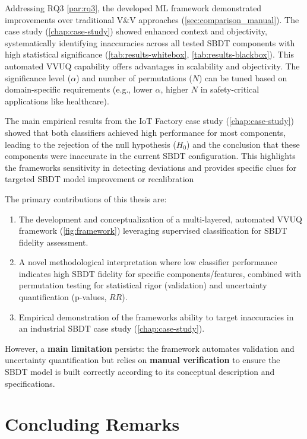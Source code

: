 Addressing RQ3 \autoref{par:rq3}, the developed ML framework demonstrated improvements over traditional V&V approaches (\autoref{sec:comparison_manual}). The case study (\autoref{chap:case-study}) showed enhanced context and objectivity, systematically identifying inaccuracies across all tested SBDT components with high statistical significance (\autoref{tab:results-whitebox}, \autoref{tab:results-blackbox}). This automated VVUQ capability offers advantages in scalability and objectivity. The significance level ($\alpha$) and number of permutations ($N$) can be tuned based on domain-specific requirements (e.g., lower $\alpha$, higher $N$ in safety-critical applications like healthcare).

The main empirical results from the IoT Factory case study (\autoref{chap:case-study}) showed that both classifiers achieved high performance for most components, leading to the rejection of the null hypothesis ($H_0$) and the conclusion that these components were inaccurate in the current SBDT configuration. This highlights the frameworks sensitivity in detecting deviations and provides specific clues for targeted SBDT model improvement or recalibration

The primary contributions of this thesis are:
\begin{enumerate}
  \item The development and conceptualization of a multi-layered, automated VVUQ framework (\autoref{fig:framework}) leveraging supervised classification for SBDT fidelity assessment.
  \item A novel methodological interpretation where low classifier performance indicates high SBDT fidelity for specific components/features, combined with permutation testing for statistical rigor (validation) and uncertainty quantification (p-values, $RR$).
  \item Empirical demonstration of the frameworks ability to target inaccuracies in an industrial SBDT case study (\autoref{chap:case-study}).
\end{enumerate}

However, a \textbf{main limitation} persists: the framework automates validation and uncertainty quantification but relies on \textbf{manual verification} to ensure the SBDT model is built correctly according to its conceptual description and specifications.

\section{Concluding Remarks}
\label{sec:conclusion_remarks}

